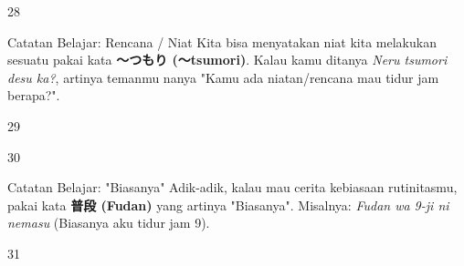\begin{convobox}{28}
    \noindent
      
      

    \vspace{1.5em}
\end{convobox}

\begin{lessonbox}{Catatan Belajar: Rencana / Niat}
    Kita bisa menyatakan niat kita melakukan sesuatu pakai kata \textbf{〜つもり (〜tsumori)}. Kalau kamu ditanya \textit{Neru tsumori desu ka?}, artinya temanmu nanya "Kamu ada niatan/rencana mau tidur jam berapa?".
\end{lessonbox}

\begin{convobox}{29}
    \noindent
      

    \vspace{1.5em}
\end{convobox}

\begin{convobox}{30}
    \noindent
      
      

    \vspace{1.5em}
\end{convobox}

\begin{lessonbox}{Catatan Belajar: "Biasanya"}
    Adik-adik, kalau mau cerita kebiasaan rutinitasmu, pakai kata \textbf{普段 (Fudan)} yang artinya "Biasanya". Misalnya: \textit{Fudan wa 9-ji ni nemasu} (Biasanya aku tidur jam 9).
\end{lessonbox}

\begin{convobox}{31}
    \noindent
      

    \vspace{1.5em}
\end{convobox}

